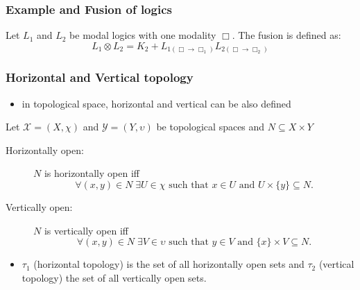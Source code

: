 \documentclass[hyperref={pdfpagelabels=false},t,10pt]{beamer}
\begin{document}
\begin{frame}
  \frametitle{Example and Fusion of logics} %

\pause

    
    \begin{definition}
      Let $L_1$ and $L_2$ be modal logics with one modality $\Box$. The fusion is defined as:
      $$ L_1 \otimes L_2 = K_2 + L_{1(\Box \rightarrow \Box_1)} L_{2(\Box \rightarrow \Box_2)} $$    
    \end{definition}



\end{frame}

\begin{frame}
  \frametitle{Horizontal and Vertical topology}
  \begin{itemize}
    \item in topological space, horizontal and vertical can be also defined \pause
  \end{itemize}
  Let \( \mathcal{X} = (X, \chi) \) and \( \mathcal{Y} = (Y, \upsilon) \) be topological spaces and \( N \subseteq X \times Y \) \newline

\begin{description}
  \item[Horizontally open:] \(N\) is horizontally open iff 
  \[
    \forall (x, y) \in N\; \exists U \in \chi \text{ such that } x \in U \text{ and } U \times \{y\} \subseteq N.
  \]

  \item[Vertically open:] \(N\) is vertically open iff 
  \[
    \forall (x, y) \in N\; \exists V \in \upsilon \text{ such that } y \in V \text{ and } \{x\} \times V \subseteq N.
  \]

\end{description}
\begin{itemize}
  \item $\tau_1$ (horizontal topology) is the set of all horizontally open sets and $\tau_2$ (vertical topology) the set of all vertically open sets.
\end{itemize}



\end{frame}
\end{document}
